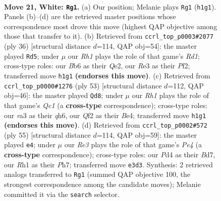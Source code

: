 \documentclass[11pt]{article}
\begin{document}
\clearpage

\begin{figure}[p]\centering
\begin{subfigure}{0.46\textwidth}\centering
\resizebox{\linewidth}{!}{%
\newchessgame
\chessboard[
  setfen={4kb1r/1p2pp1n/1B1p2p1/1b6/3PP2p/rP2RP2/P4QPP/2K4R w k - 0 21},
  showmover=false,
  pgfstyle=straightmove, color=movearrow, markmove={h1-g1}
]}
\caption{}
\end{subfigure}\hfill
\begin{subfigure}{0.46\textwidth}\centering
\resizebox{\linewidth}{!}{%
\newchessgame
\chessboard[
  setfen={r3kbr1/1pp4p/p1n2p2/2p5/2N1P3/5PBq/PP2QP1P/R2R3K w q - 7 19},
  showmover=false,
  pgfstyle=straightmove, color=movearrow, markmove={d1-d5}
]}
\caption{}
\end{subfigure}
\\[4pt]
\begin{subfigure}{0.46\textwidth}\centering
\resizebox{\linewidth}{!}{%
\newchessgame
\chessboard[
  setfen={2q3k1/2p2p2/pp2r1pQ/3p4/PP1Pb1P1/2P4P/1R3P2/5BK1 b - - 0 27},
  showmover=false,
  pgfstyle=straightmove, color=movearrow, markmove={c8-d8}
]}
\caption{}
\end{subfigure}\hfill
\begin{subfigure}{0.46\textwidth}\centering
\resizebox{\linewidth}{!}{%
\newchessgame
\chessboard[
  setfen={8/1p1b2kp/3q2p1/1r1Ppp2/1pR5/6PP/PP3PB1/3Q2K1 b - - 3 28},
  showmover=false,
  pgfstyle=straightmove, color=movearrow, markmove={e5-e4}
]}
\caption{}
\end{subfigure}
\caption{\textbf{Move 21, White: \texttt{Rg1}.} (a) Our position; Melanie plays \texttt{Rg1} (\texttt{h1g1}). Panels (b)--(d) are the retrieved master positions whose correspondence most drove this move (highest QAP objective among those that transfer to it). (b) Retrieved from \texttt{ccrl\_top\_p0003\#2077} (ply 36) [structural distance $d$=114, QAP obj=54]: the master played \texttt{Rd5}; under $\mu$ our \emph{Rh1} plays the role of that game's \emph{Rd1}; cross-type roles: our \emph{B}b6 as their \emph{Q}e2, our \emph{R}e3 as their \emph{P}f2; transferred move \texttt{h1g1} \textbf{(endorses this move)}. (c) Retrieved from \texttt{ccrl\_top\_p0000\#1276} (ply 53) [structural distance $d$=112, QAP obj=46]: the master played \texttt{Qd8}; under $\mu$ our \emph{Rh1} plays the role of that game's \emph{Qc1} (a \textbf{cross-type} correspondence); cross-type roles: our \emph{r}a3 as their \emph{q}h6, our \emph{Q}f2 as their \emph{B}e4; transferred move \texttt{h1g1} \textbf{(endorses this move)}. (d) Retrieved from \texttt{ccrl\_top\_p0002\#572} (ply 55) [structural distance $d$=114, QAP obj=59]: the master played \texttt{e4}; under $\mu$ our \emph{Re3} plays the role of that game's \emph{Pe4} (a \textbf{cross-type} correspondence); cross-type roles: our \emph{P}d4 as their \emph{B}d7, our \emph{R}h1 as their \emph{P}h7; transferred move \texttt{e3d3}. Synthesis: 2 retrieved analogs transferred to \texttt{Rg1} (summed QAP objective 100, the strongest correspondence among the candidate moves); Melanie committed it via the \texttt{search} selector.}
\label{fig:thought-m40}
\end{figure}
\end{document}
